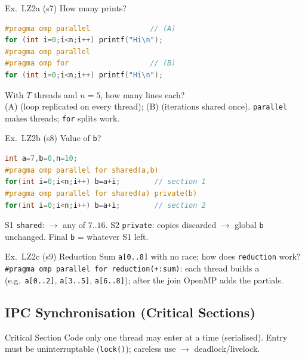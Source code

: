 
\begin{example2}{Ex.\ LZ2a (s7) How many prints?}
\begin{lstlisting}[language=C, style=basesmol]
#pragma omp parallel              // (A)
for (int i=0;i<n;i++) printf("Hi\n");
#pragma omp parallel
#pragma omp for                   // (B)
for (int i=0;i<n;i++) printf("Hi\n");
\end{lstlisting}
    With $T$ threads and $n=5$, how many lines each?
     \\ 
    (A)  (loop replicated on every thread); (B)  (iterations shared once). \texttt{parallel} makes threads; \texttt{for} splits work.
\end{example2}



\begin{example2}{Ex.\ LZ2b (s8) Value of \texttt{b}?}
\begin{lstlisting}[language=C, style=basesmol]
int a=7,b=0,n=10;
#pragma omp parallel for shared(a,b)
for(int i=0;i<n;i++) b=a+i;        // section 1
#pragma omp parallel for shared(a) private(b)
for(int i=0;i<n;i++) b=a+i;        // section 2
\end{lstlisting}
    S1 \texttt{shared}:  $\to$ any of $7..16$. S2 \texttt{private}: copies discarded $\to$ global \texttt{b} unchanged. Final \texttt{b} = whatever S1 left.
\end{example2}

\multend

\begin{example2}{Ex.\ LZ2c (s9) Reduction}
    Sum \texttt{a[0..8]} with no race; how does \texttt{reduction} work?
     \\ 
    \texttt{\#pragma omp parallel for reduction(+:sum)}: each thread builds a  (e.g.\ \texttt{a[0..2]}, \texttt{a[3..5]}, \texttt{a[6..8]}); after the join OpenMP adds the partials.
\end{example2}

\raggedcolumns
\columnbreak

\subsection{IPC Synchronisation (Critical Sections)}

\begin{definition}{Critical Section}
    Code only one thread may enter at a time (serialised). Entry must be uninterruptable (\texttt{lock()}); careless use $\to$ deadlock/livelock.
\end{definition}

